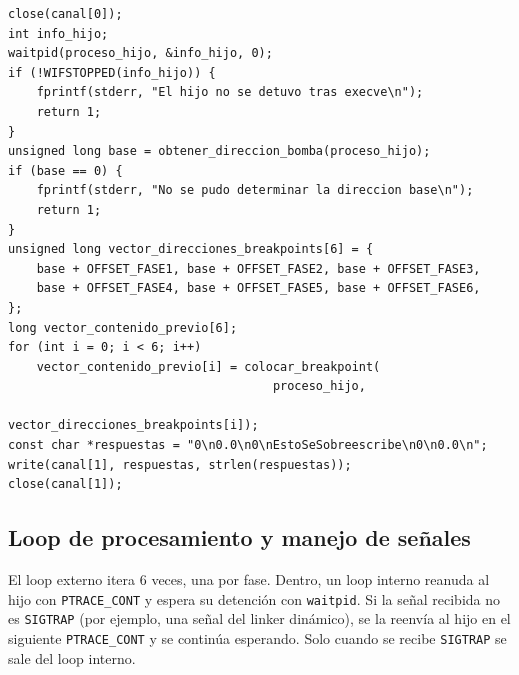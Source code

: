\documentclass[10pt,a4paper]{article}
\begin{document}
\begin{lstlisting}[style=cstyle, caption={Inicializacion del padre}]
close(canal[0]);
int info_hijo;
waitpid(proceso_hijo, &info_hijo, 0);
if (!WIFSTOPPED(info_hijo)) {
    fprintf(stderr, "El hijo no se detuvo tras execve\n");
    return 1;
}
unsigned long base = obtener_direccion_bomba(proceso_hijo);
if (base == 0) {
    fprintf(stderr, "No se pudo determinar la direccion base\n");
    return 1;
}
unsigned long vector_direcciones_breakpoints[6] = {
    base + OFFSET_FASE1, base + OFFSET_FASE2, base + OFFSET_FASE3,
    base + OFFSET_FASE4, base + OFFSET_FASE5, base + OFFSET_FASE6,
};
long vector_contenido_previo[6];
for (int i = 0; i < 6; i++)
    vector_contenido_previo[i] = colocar_breakpoint(
                                     proceso_hijo,
                                     vector_direcciones_breakpoints[i]);
const char *respuestas = "0\n0.0\n0\nEstoSeSobreescribe\n0\n0.0\n";
write(canal[1], respuestas, strlen(respuestas));
close(canal[1]);
\end{lstlisting}

\subsection{Loop de procesamiento y manejo de señales}

El loop externo itera 6 veces, una por fase. Dentro, un loop interno reanuda al hijo con \texttt{PTRACE\_CONT} y espera su detención con \texttt{waitpid}. Si la señal recibida no es \texttt{SIGTRAP} (por ejemplo, una señal del linker dinámico), se la reenvía al hijo en el siguiente \texttt{PTRACE\_CONT} y se continúa esperando. Solo cuando se recibe \texttt{SIGTRAP} se sale del loop interno.
\end{document}
